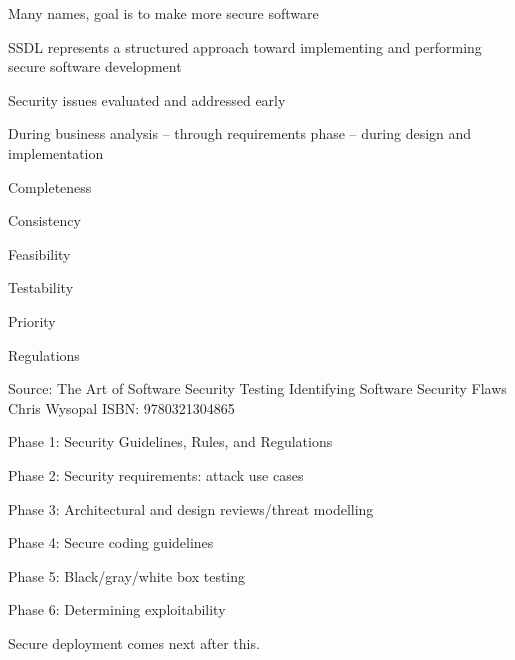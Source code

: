 \documentclass[Screen16to9,17pt]{foils}
\begin{document}
Many names, goal is to make more secure software



\begin{list2}
\item SSDL represents a structured approach toward implementing and performing secure software development
\item Security issues evaluated and addressed early
\item During business analysis -- through requirements phase -- during design and implementation
\end{list2}



\begin{list2}
\item Completeness
\item Consistency
\item Feasibility
\item Testability
\item Priority
\item Regulations
\end{list2}

Source: The Art of Software Security Testing Identifying Software Security Flaws
Chris Wysopal ISBN: 9780321304865


\begin{list2}
\item Phase 1: Security Guidelines, Rules, and Regulations
\item Phase 2: Security requirements: attack use cases
\item Phase 3: Architectural and design reviews/threat modelling
\item Phase 4: Secure coding guidelines
\item Phase 5: Black/gray/white box testing
\item Phase 6: Determining exploitability
\end{list2}

Secure deployment comes next after this.

\end{document}
